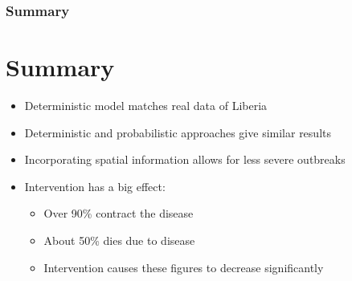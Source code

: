 \documentclass[30pt]{beamer}
\begin{document}
\begin{frame}
\frametitle{Summary}
\section{Summary}
\begin{itemize}
\item Deterministic model matches real data of Liberia
\item Deterministic and probabilistic approaches give similar results
\item Incorporating spatial information allows for less severe outbreaks
\item Intervention has a big effect:
\begin{itemize}
\item Over 90\% contract the disease
\item About 50\% dies due to disease
\item Intervention causes these figures to decrease significantly 
\end{itemize}
\end{itemize}
\end{frame}
\end{document}
